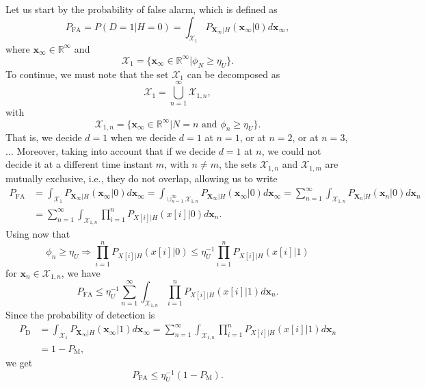 Let us start by the probability of false alarm, which is defined as
\begin{equation*}
	P_{\text{FA}} = P(D = 1 | H = 0) = \int_{\mathcal{X}_1} P_{\mathbf{X}_{\infty} | H} (\mathbf{x}_{\infty} | 0) d \mathbf{x}_{\infty},
\end{equation*}
where $\mathbf{x}_{\infty} \in \mathbb{R}^{\infty}$ and
\begin{equation*}
	\mathcal{X}_1 = \{ \mathbf{x}_{\infty} \in \mathbb{R}^{\infty} | \phi_{N} \geq  \eta_U  \}.
\end{equation*}
To continue, we must note that the set $\mathcal{X}_1$ can be decomposed as
\begin{equation*}
	\mathcal{X}_1 = \mathop{\bigcup}\limits_{n = 1}^{\infty} \mathcal{X}_{1,n},
\end{equation*}
with
\begin{equation*}
	\mathcal{X}_{1,n} = \{ \mathbf{x}_{\infty} \in \mathbb{R}^{\infty} |N = n \text{ and } \phi_{n} \geq  \eta_U  \}.
\end{equation*}
That is, we decide $d = 1$ when we decide $d = 1$ at $n = 1$, or at $n = 2$, or at $n = 3$, $\ldots$ Moreover, taking into account that if we decide $d = 1$ at $n$, we could not decide it at a different time instant $m$, with $n \neq m$, the sets $\mathcal{X}_{1,n}$ and $\mathcal{X}_{1,m}$ are mutually exclusive, i.e., they do not overlap, allowing us to write
\begin{align*}
	P_{\text{FA}} &= \int_{\mathcal{X}_1} P_{\mathbf{X}_{\infty} | H} (\mathbf{x}_{\infty} | 0) d \mathbf{x}_{\infty} 
	= \int_{\cup_{n = 1}^{\infty} \mathcal{X}_{1,n}} P_{\mathbf{X}_{\infty} | H} (\mathbf{x}_{\infty} | 0) d \mathbf{x}_{\infty} 
	= \sum_{n = 1}^{\infty}  \int_{\mathcal{X}_{1,n}} P_{\mathbf{X}_{n} | H} (\mathbf{x}_{n} | 0) d \mathbf{x}_{n} \\
	&= \sum_{n = 1}^{\infty}  \int_{\mathcal{X}_{1,n}} \prod_{i = 1}^{n} P_{X[i] | H}(x[i] | 0)  d \mathbf{x}_{n}.
\end{align*}
Using now that
\begin{equation*}
	\phi_n \geq \eta_U \Rightarrow   \prod_{i = 1}^{n} P_{X[i] | H}(x[i] | 0) \leq \eta_U^{-1} \prod_{i = 1}^{n} P_{X[i] | H}(x[i] | 1)
\end{equation*}
for $\mathbf{x}_n \in \mathcal{X}_{1,n}$, we have 
\begin{equation*}
	P_{\text{FA}} \leq  \eta_U^{-1} \sum_{n = 1}^{\infty}  \int_{\mathcal{X}_{1,n}}  \prod_{i = 1}^{n} P_{X[i] | H}(x[i] | 1)  d \mathbf{x}_{n}.
\end{equation*}
Since the probability of detection is
\begin{align*}
	P_{\text{D}} &= \int_{\mathcal{X}_1} P_{\mathbf{X}_{\infty} | H} (\mathbf{x}_{\infty} | 1) d \mathbf{x}_{\infty} 
	= \sum_{n = 1}^{\infty}  \int_{\mathcal{X}_{1,n}} \prod_{i = 1}^{n} P_{X[i] | H}(x[i] | 1)  d \mathbf{x}_{n} \\
	&= 1 - P_{\text{M}},
\end{align*}
we get
\begin{equation}
	\label{eq:bound_pfa}
	P_{\text{FA}} \leq  \eta_U^{-1} \left(1 - P_{\text{M}}\right).
\end{equation}

